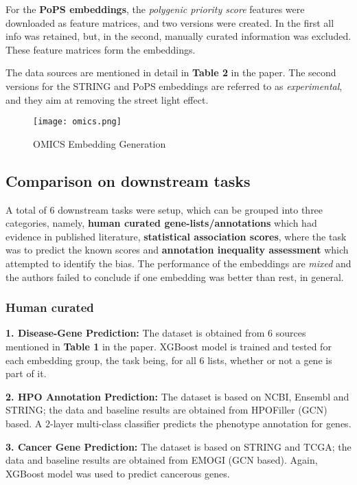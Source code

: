 \begin{sloppypar*}
    \noindent For the \textbf{PoPS embeddings}, the \textit{polygenic priority score}
    features were downloaded as feature matrices, and two versions were created.
    In the first all info was retained, but, in the second, manually curated
    information was excluded. These feature matrices form the embeddings. \hfill\break

    \noindent The data sources are mentioned in detail in \textbf{Table 2} in the
    paper. The second versions for the STRING and PoPS embeddings are referred to
    as \textit{experimental}, and they aim at removing the street light effect.

    \begin{figure}
        \centering
        \texttt{[image: omics.png]}
        \caption{OMICS Embedding Generation}
        \label{fig:omicsembed}
    \end{figure}

    \subsection{Comparison on downstream tasks}
    A total of $6$ downstream tasks were setup, which can be grouped into three
    categories, namely, \textbf{human curated gene-lists/annotations} which had
    evidence in published literature, \textbf{statistical association scores},
    where the task was to predict the known scores and \textbf{annotation
    inequality assessment} which attempted to identify the bias. The performance
    of the embeddings are \textit{mixed} and the authors failed to conclude if
    one embedding was better than rest, in general.

    \subsubsection{Human curated}
    \textbf{1. Disease-Gene Prediction:} The dataset is obtained from $6$ sources
    mentioned in \textbf{Table 1} in the paper. XGBoost model is trained and
    tested for each embedding group, the task being, for all $6$ lists, whether
    or not a gene is part of it.

    \textbf{2. HPO Annotation Prediction:} The dataset is based on NCBI, Ensembl
    and STRING; the data and baseline results are obtained from HPOFiller (GCN)
    based. A $2$-layer multi-class classifier predicts the phenotype annotation
    for genes.

    \textbf{3. Cancer Gene Prediction:} The dataset is based on STRING and TCGA;
    the data and baseline results are obtained from EMOGI (GCN based). Again,
    XGBoost model was used to predict cancerous genes.


\end{sloppypar*}
